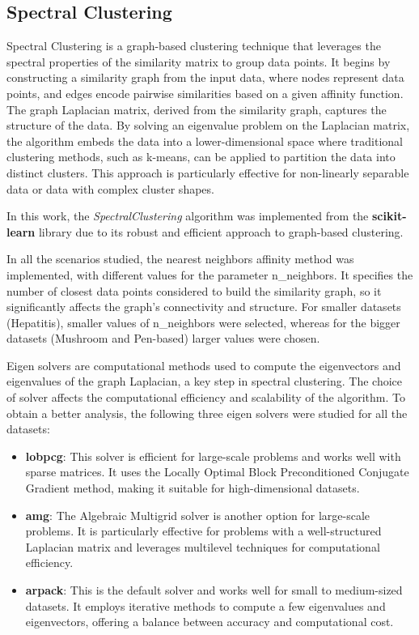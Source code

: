 \subsection{Spectral Clustering}
Spectral Clustering is a graph-based clustering technique that leverages the spectral properties of the similarity matrix
 to group data points. It begins by constructing a similarity graph from the input data, where nodes represent data points,
 and edges encode pairwise similarities based on a given affinity function. The graph Laplacian matrix, derived from the
 similarity graph, captures the structure of the data. By solving an eigenvalue problem on the Laplacian matrix, the
 algorithm embeds the data into a lower-dimensional space where traditional clustering methods, such as k-means, can
 be applied to partition the data into distinct clusters. This approach is particularly effective for non-linearly
 separable data or data with complex cluster shapes.


In this work, the \textit{SpectralClustering} algorithm was implemented from the \textbf{scikit-learn} library due
to its robust and efficient approach to graph-based clustering.

In all the scenarios studied, the nearest neighbors affinity method was implemented, with different values for the
parameter n\_neighbors. It specifies the number of closest data points considered to build the similarity graph,
so it significantly affects the graph's connectivity and structure. For smaller datasets (Hepatitis), smaller values of
n\_neighbors were selected, whereas for the bigger datasets (Mushroom and Pen-based) larger values were chosen.

Eigen solvers are computational methods used to compute the eigenvectors and eigenvalues of the graph Laplacian,
a key step in spectral clustering. The choice of solver affects the computational efficiency and scalability of the algorithm.
To obtain a better analysis, the following three eigen solvers were studied for all the datasets:

  \begin{itemize}
    \item \textbf{lobpcg}: This solver is efficient for large-scale problems and works well with sparse matrices. It uses the Locally Optimal Block Preconditioned Conjugate Gradient method, making it suitable for high-dimensional datasets.
    \item \textbf{amg}: The Algebraic Multigrid solver is another option for large-scale problems. It is particularly effective for problems with a well-structured Laplacian matrix and leverages multilevel techniques for computational efficiency.
    \item \textbf{arpack}: This is the default solver and works well for small to medium-sized datasets. It employs iterative methods to compute a few eigenvalues and eigenvectors, offering a balance between accuracy and computational cost.
\end{itemize}


